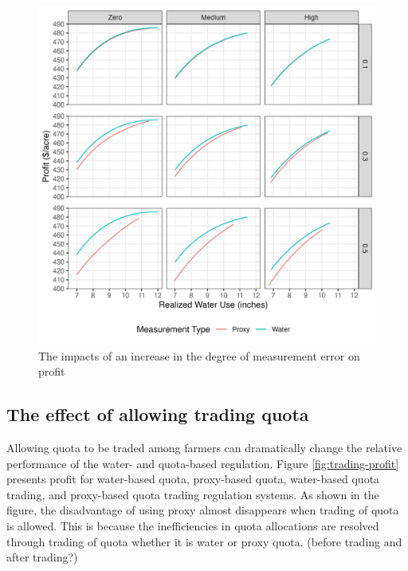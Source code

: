 \documentclass[
]{article}
\begin{document}
\begin{figure}[H]

{\centering \includegraphics{figures/g_profit_quota_comp_stat} 

}

\caption{The impacts of an increase in the degree of measurement error on profit}\label{fig:increase-me-degree}
\end{figure}

\hypertarget{the-effect-of-allowing-trading-quota}{%
\subsection{The effect of allowing trading quota}\label{the-effect-of-allowing-trading-quota}}

Allowing quota to be traded among farmers can dramatically change the relative performance of the water- and quota-based regulation. Figure \ref{fig:trading-profit} presents profit for water-based quota, proxy-based quota, water-based quota trading, and proxy-based quota trading regulation systems. As shown in the figure, the disadvantage of using proxy almost disappears when trading of quota is allowed. This is because the inefficiencies in quota allocations are resolved through trading of quota whether it is water or proxy quota. (before trading and after trading?)
\end{document}
